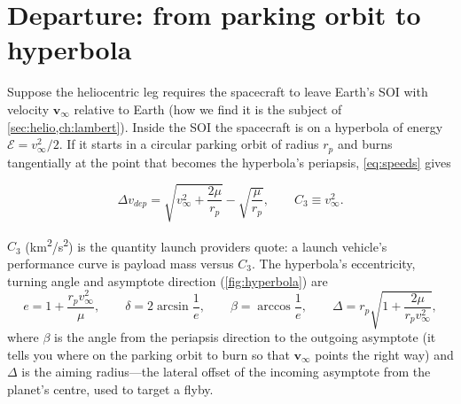 \documentclass[11pt,letterpaper,oneside]{report}
\newcommand{\dv}{\Delta v}
\newcommand{\vinf}{v_\infty}
\newcommand{\En}{\mathcal E}
\newcommand{\bv}[1]{\bm{#1}}
\begin{document}
\section{Departure: from parking orbit to hyperbola}\label{sec:departure}
Suppose the heliocentric leg requires the spacecraft to leave Earth's SOI with velocity
$\bv\vinf$ relative to Earth (how we find it is the subject of \cref{sec:helio,ch:lambert}).
Inside the SOI the spacecraft is on a hyperbola of energy $\En=\vinf^2/2$. If it starts in a
circular parking orbit of radius $r_p$ and burns tangentially at the point that becomes the
hyperbola's periapsis, \cref{eq:speeds} gives
\begin{keyresult}
\begin{equation}
  \dv_{dep}=\sqrt{\vinf^2+\frac{2\mu}{r_p}}-\sqrt{\frac{\mu}{r_p}},\qquad C_3\equiv\vinf^2 .
  \label{eq:departure}
\end{equation}
\end{keyresult}
$C_3$ (\si{km^2/s^2}) is the quantity launch providers quote: a launch vehicle's performance curve is
payload mass versus $C_3$. The hyperbola's eccentricity, turning angle and asymptote direction
(\cref{fig:hyperbola}) are
\begin{equation}
  e=1+\frac{r_p\vinf^2}{\mu},\qquad \delta=2\arcsin\frac1e,\qquad \beta=\arccos\frac1e,
  \qquad \Delta=r_p\sqrt{1+\frac{2\mu}{r_p\vinf^2}},
\end{equation}
where $\beta$ is the angle from the periapsis direction to the outgoing asymptote (it tells you
where on the parking orbit to burn so that $\bv\vinf$ points the right way) and $\Delta$ is the
aiming radius---the lateral offset of the incoming asymptote from the planet's centre, used to
target a flyby.
\end{document}
